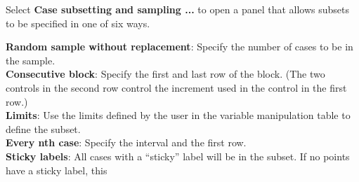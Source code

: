 \documentclass[11pt]{article}
\def\Widget#1{\textbf{#1}}
\begin{document}
Select \Widget{Case subsetting and sampling ...} to open a panel
that allows subsets to be specified in one of six ways.

\Widget{Random sample without replacement}:  Specify the number of
     cases to be in the sample.
\\\Widget{Consecutive block}:  Specify the first and last row of the block.
     (The two controls in the second row control the increment used
     in the control in the first row.)
\\\Widget{Limits}:  Use the limits defined by the user in the variable
     manipulation table to define the subset.
\\\Widget{Every nth case}:  Specify the interval and the first row.
\\\Widget{Sticky labels}:  All cases with a ``sticky'' label will
  be in the subset.  If no points have a sticky label, this
\end{document}
